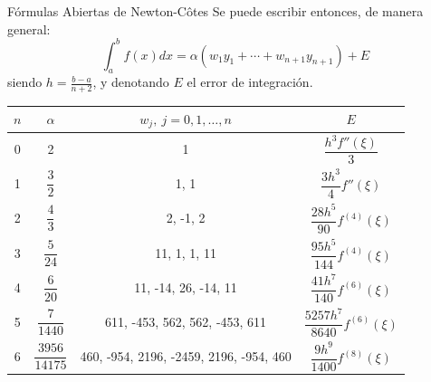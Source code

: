 \documentclass[12pt]{beamer}
\begin{document}
\begin{frame}{F\'ormulas Abiertas de Newton-C\^otes}
  Se puede escribir entonces, de manera general:
  \footnotesize{
$$
\int_a^bf(x)dx =\alpha(w_1y_1+\cdots+w_{n+1}y_{n+1})+E
$$}\normalsize
siendo $h=\frac{b-a}{n+2}$, y denotando $E$ el error de integraci\'on.
  \tiny{
    \begin{center}
      \begin{tabular}{@{} |c| c| c| c| @{}} 
        \toprule
        $n$ & $\alpha$ & $w_j,\ j=0,1,\ldots,n$ & $E$ \\[-1pt] 
        \midrule
        0 & 2 & 1 & $\dfrac{h^3f''(\xi)}{3}$ \\[-1pt]
        \midrule
        1 & $\dfrac{3}{2}$ & 1, 1 & $\dfrac{3h^3}{4}f''(\xi)$ \\[-1pt]
        \midrule
        2 & $\dfrac{4}{3}$ & 2, -1, 2 & $\dfrac{28h^5}{90}f^{(4)}(\xi)$ \\[-1pt]
        \midrule
        3 & $\dfrac{5}{24}$ & 11, 1, 1, 11 & $\dfrac{95h^5}{144}f^{(4)}(\xi)$ \\[-1pt]
        \midrule
        4 & $\dfrac{6}{20}$ & 11, -14, 26, -14, 11 & $\dfrac{41h^7}{140}f^{(6)}(\xi)$ \\[-1pt]
        \midrule
        5 & $\dfrac{7}{1440}$ & 611, -453, 562, 562, -453, 611 & $\dfrac{5257h^7}{8640}f^{(6)}(\xi)$ \\[-1pt]
        \midrule
        6 & $\dfrac{3956}{14175}$ & 460, -954, 2196, -2459, 2196, -954, 460 & $\dfrac{9h^9}{1400}f^{(8)}(\xi)$ \\
        \bottomrule
        \end{tabular}
\end{center}}
\end{frame}
\end{document}
